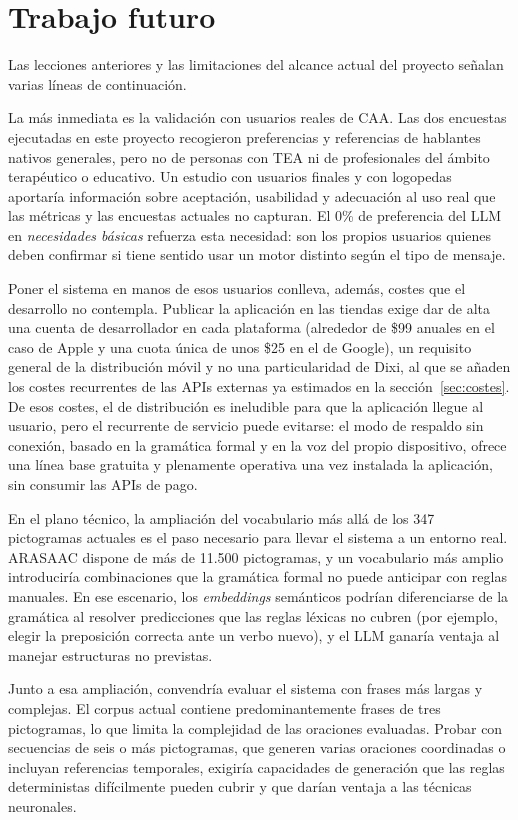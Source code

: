 \section{Trabajo futuro}

Las lecciones anteriores y las limitaciones del alcance actual del proyecto señalan varias líneas de continuación.

La más inmediata es la validación con usuarios reales de CAA. Las dos encuestas ejecutadas en este proyecto recogieron preferencias y referencias de hablantes nativos generales, pero no de personas con TEA ni de profesionales del ámbito terapéutico o educativo. Un estudio con usuarios finales y con logopedas aportaría información sobre aceptación, usabilidad y adecuación al uso real que las métricas y las encuestas actuales no capturan. El 0\% de preferencia del LLM en \textit{necesidades básicas} refuerza esta necesidad: son los propios usuarios quienes deben confirmar si tiene sentido usar un motor distinto según el tipo de mensaje.

Poner el sistema en manos de esos usuarios conlleva, además, costes que el desarrollo no contempla. Publicar la aplicación en las tiendas exige dar de alta una cuenta de desarrollador en cada plataforma (alrededor de \$99 anuales en el caso de Apple y una cuota única de unos \$25 en el de Google), un requisito general de la distribución móvil y no una particularidad de Dixi, al que se añaden los costes recurrentes de las APIs externas ya estimados en la sección~\ref{sec:costes}. De esos costes, el de distribución es ineludible para que la aplicación llegue al usuario, pero el recurrente de servicio puede evitarse: el modo de respaldo sin conexión, basado en la gramática formal y en la voz del propio dispositivo, ofrece una línea base gratuita y plenamente operativa una vez instalada la aplicación, sin consumir las APIs de pago.

En el plano técnico, la ampliación del vocabulario más allá de los 347 pictogramas actuales es el paso necesario para llevar el sistema a un entorno real. ARASAAC dispone de más de 11.500 pictogramas, y un vocabulario más amplio introduciría combinaciones que la gramática formal no puede anticipar con reglas manuales. En ese escenario, los \textit{embeddings} semánticos podrían diferenciarse de la gramática al resolver predicciones que las reglas léxicas no cubren (por ejemplo, elegir la preposición correcta ante un verbo nuevo), y el LLM ganaría ventaja al manejar estructuras no previstas.

Junto a esa ampliación, convendría evaluar el sistema con frases más largas y complejas. El corpus actual contiene predominantemente frases de tres pictogramas, lo que limita la complejidad de las oraciones evaluadas. Probar con secuencias de seis o más pictogramas, que generen varias oraciones coordinadas o incluyan referencias temporales, exigiría capacidades de generación que las reglas deterministas difícilmente pueden cubrir y que darían ventaja a las técnicas neuronales.

